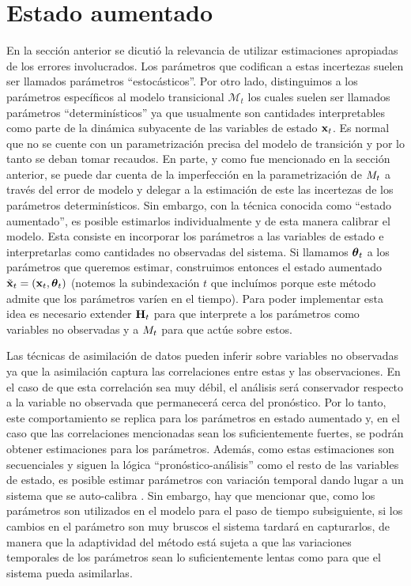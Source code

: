 \section{Estado aumentado}

En la sección anterior se dicutió la relevancia de utilizar estimaciones apropiadas de los errores involucrados. Los parámetros que codifican a estas incertezas suelen ser llamados parámetros ``estocásticos''. Por otro lado, distinguimos a los parámetros específicos al modelo transicional $\mathcal{M}_t$ los cuales suelen ser llamados parámetros ``determinísticos'' ya que usualmente son cantidades interpretables como parte de la dinámica subyacente de las variables de estado $\mathbf{x}_t$. Es normal que no se cuente con un parametrización precisa del modelo de transición y por lo tanto se deban tomar recaudos. En parte, y como fue mencionado en la sección anterior, se puede dar cuenta de la imperfección en la parametrización de $\mathbf{\mathcal}{M}_t$ a través del error de modelo y delegar a la estimación de este las incertezas de los parámetros determinísticos. Sin embargo, con la técnica conocida como ``estado aumentado'', es posible estimarlos individualmente y de esta manera calibrar el modelo. Esta consiste en incorporar los parámetros a las variables de estado e interpretarlas como cantidades no observadas del sistema. Si llamamos $\mbox{\boldmath$ \theta $}_t$ a los parámetros que queremos estimar, construimos entonces el estado aumentado $\tilde{\mathbf{x}}_t = (\mathbf{x}_t, \mbox{\boldmath$ \theta $}_t)$ (notemos la subindexación $t$ que incluímos porque este método admite que los parámetros varíen en el tiempo). Para poder implementar esta idea es necesario extender $\mathbf{H}_t$ para que interprete a los parámetros como variables no observadas y a $\mathbf{\mathcal}{M}_t$ para que actúe sobre estos.

Las técnicas de asimilación de datos pueden inferir sobre variables no observadas ya que la asimilación captura las correlaciones entre estas y las observaciones. En el caso de que esta correlación sea muy débil, el análisis será conservador respecto a la variable no observada que permanecerá cerca del pronóstico. Por lo tanto, este comportamiento se replica para los parámetros en estado aumentado y, en el caso que las correlaciones mencionadas sean los suficientemente fuertes, se podrán obtener estimaciones para los parámetros. Además, como estas estimaciones son secuenciales y siguen la lógica ``pronóstico-análisis'' como el resto de las variables de estado, es posible estimar parámetros con variación temporal dando lugar a un sistema que se auto-calibra \citep{Ruiz2013}. Sin embargo, hay que mencionar que, como los parámetros son utilizados en el modelo para el paso de tiempo subsiguiente, si los cambios en el parámetro son muy bruscos el sistema tardará en capturarlos, de manera que la adaptividad del método está sujeta a que las variaciones temporales de los parámetros sean lo suficientemente lentas como para que el sistema pueda asimilarlas. 

